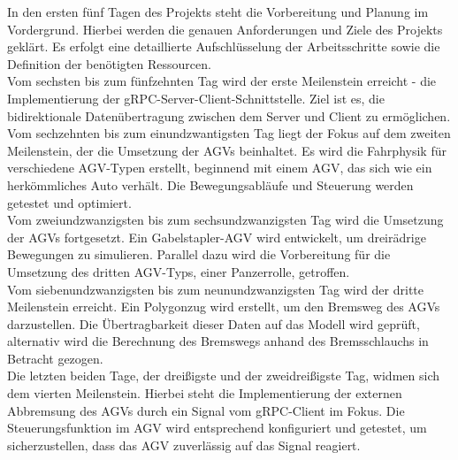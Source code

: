 In den ersten fünf Tagen des Projekts steht die Vorbereitung und Planung im Vordergrund. Hierbei werden die genauen Anforderungen und Ziele des Projekts geklärt. Es erfolgt eine detaillierte Aufschlüsselung der Arbeitsschritte sowie die Definition der benötigten Ressourcen.\\
Vom sechsten bis zum fünfzehnten Tag wird der erste Meilenstein erreicht - die Implementierung der gRPC-Server-Client-Schnittstelle. Ziel ist es, die bidirektionale Datenübertragung zwischen dem Server und Client zu ermöglichen.\\
Vom sechzehnten bis zum einundzwantigsten Tag liegt der Fokus auf dem zweiten Meilenstein, der die Umsetzung der AGVs beinhaltet. Es wird die Fahrphysik für verschiedene AGV-Typen erstellt, beginnend mit einem AGV, das sich wie ein herkömmliches Auto verhält. Die Bewegungsabläufe und Steuerung werden getestet und optimiert.\\
Vom zweiundzwanzigsten bis zum sechsundzwanzigsten Tag wird die Umsetzung der AGVs fortgesetzt. Ein Gabelstapler-AGV wird entwickelt, um dreirädrige Bewegungen zu simulieren. Parallel dazu wird die Vorbereitung für die Umsetzung des dritten AGV-Typs, einer Panzerrolle, getroffen.\\
Vom siebenundzwanzigsten bis zum neunundzwanzigsten Tag wird der dritte Meilenstein erreicht. Ein Polygonzug wird erstellt, um den Bremsweg des AGVs darzustellen. Die Übertragbarkeit dieser Daten auf das Modell wird geprüft, alternativ wird die Berechnung des Bremswegs anhand des Bremsschlauchs in Betracht gezogen.\\
Die letzten beiden Tage, der dreißigste und der zweidreißigste Tag, widmen sich dem vierten Meilenstein. Hierbei steht die Implementierung der externen Abbremsung des AGVs durch ein Signal vom gRPC-Client im Fokus. Die Steuerungsfunktion im AGV wird entsprechend konfiguriert und getestet, um sicherzustellen, dass das AGV zuverlässig auf das Signal reagiert.\\



